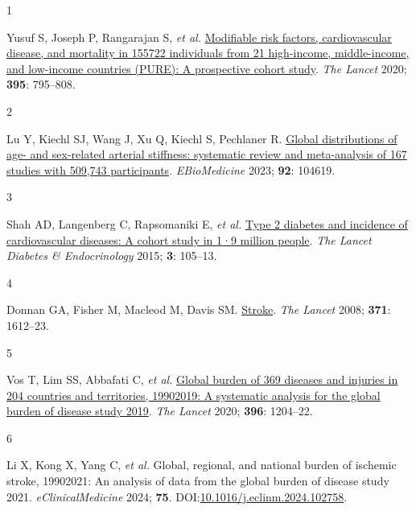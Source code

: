\documentclass[
  a4paper,
  headsepline=true,
  open=any]{scrbook}
\newlength{\cslhangindent}
\newlength{\csllabelwidth}
\newlength{\cslentryspacingunit} %
\newenvironment{CSLReferences}[2] %
 {%
  \setlength{\parindent}{0pt}
  \ifodd #1
  \let\oldpar\par
  \def\par{\hangindent=\cslhangindent\oldpar}
  \fi
  \setlength{\parskip}{#2\cslentryspacingunit}
 }%
 {}
\newcommand{\CSLLeftMargin}[1]{\parbox[t]{\csllabelwidth}{#1}}
\newcommand{\CSLRightInline}[1]{\parbox[t]{\linewidth - \csllabelwidth}{#1}\break}
\begin{document}

\hypertarget{refs}{}
\begin{CSLReferences}{0}{0}
\leavevmode{}%
\CSLLeftMargin{1 }%
\CSLRightInline{Yusuf S, Joseph P, Rangarajan S, \emph{et al.}
\href{https://doi.org/10.1016/S0140-6736(19)32008-2}{Modifiable risk
factors, cardiovascular disease, and mortality in 155{\hphantom{,}}722
individuals from 21 high-income, middle-income, and low-income countries
(PURE): A prospective cohort study}. \emph{The Lancet} 2020;
\textbf{395}: 795--808.}

\leavevmode{}%
\CSLLeftMargin{2 }%
\CSLRightInline{Lu Y, Kiechl SJ, Wang J, Xu Q, Kiechl S, Pechlaner R.
\href{https://doi.org/10.1016/j.ebiom.2023.104619}{Global distributions
of age- and sex-related arterial stiffness: systematic review and
meta-analysis of 167 studies with 509,743 participants}.
\emph{EBioMedicine} 2023; \textbf{92}: 104619.}

\leavevmode{}%
\CSLLeftMargin{3 }%
\CSLRightInline{Shah AD, Langenberg C, Rapsomaniki E, \emph{et al.}
\href{https://doi.org/10.1016/S2213-8587(14)70219-0}{Type 2 diabetes and
incidence of cardiovascular diseases: A cohort study in 1·9 million
people}. \emph{The Lancet Diabetes \& Endocrinology} 2015; \textbf{3}:
105--13.}

\leavevmode{}%
\CSLLeftMargin{4 }%
\CSLRightInline{Donnan GA, Fisher M, Macleod M, Davis SM.
\href{https://doi.org/10.1016/S0140-6736(08)60694-7}{Stroke}. \emph{The
Lancet} 2008; \textbf{371}: 1612--23.}

\leavevmode{}%
\CSLLeftMargin{5 }%
\CSLRightInline{Vos T, Lim SS, Abbafati C, \emph{et al.}
\href{https://doi.org/10.1016/S0140-6736(20)30925-9}{Global burden of
369 diseases and injuries in 204 countries and territories,
1990{\textendash}2019: A systematic analysis for the global burden of
disease study 2019}. \emph{The Lancet} 2020; \textbf{396}: 1204--22.}

\leavevmode{}%
\CSLLeftMargin{6 }%
\CSLRightInline{Li X, Kong X, Yang C, \emph{et al.} Global, regional,
and national burden of ischemic stroke, 1990{\textendash}2021: An
analysis of data from the global burden of disease study 2021.
\emph{eClinicalMedicine} 2024; \textbf{75}.
DOI:\href{https://doi.org/10.1016/j.eclinm.2024.102758}{10.1016/j.eclinm.2024.102758}.}


\end{CSLReferences}
\end{document}
